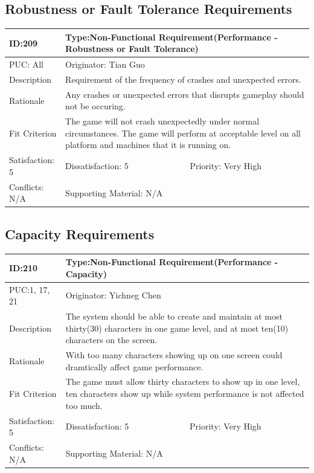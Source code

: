 \documentclass{article}
\begin{document}
	\subsection{Robustness or Fault Tolerance Requirements}
	\begin{table}[H]
		\begin{tabular}{|l|l|l|}
			\hline
			ID:209 & \multicolumn{2}{l|}{Type:Non-Functional Requirement(Performance - Robustness or Fault Tolerance)} \\ \hline
			PUC: All & \multicolumn{2}{l|}{Originator: Tian Guo} \\ \hline
			Description & \multicolumn{2}{m{0.85\textwidth}|}{Requirement of the frequency of crashes and unexpected errors.} \\ \hline
			Rationale & \multicolumn{2}{m{0.85\textwidth}|}{Any crashes or unexpected errors that disrupts gameplay should not be occuring.} \\ \hline
			Fit Criterion & \multicolumn{2}{m{0.85\textwidth}|}{The game will not crash unexpectedly under normal circumstances. The game will perform at acceptable level on all platform and machines that it is running on.} \\ \hline
			Satisfaction: 5 & Dissatisfaction: 5 & Priority: Very High \\ \hline
			Conflicts: N/A & \multicolumn{2}{l|}{Supporting Material: N/A} \\ \hline
		\end{tabular}
	\end{table}

	\subsection{Capacity Requirements}
	\begin{table}[H]
		\begin{tabular}{|l|l|l|}
			\hline
			ID:210 & \multicolumn{2}{l|}{Type:Non-Functional Requirement(Performance - Capacity)} \\ \hline
			PUC:1, 17, 21 & \multicolumn{2}{l|}{Originator: Yichneg Chen} \\ \hline
			Description & \multicolumn{2}{m{0.85\textwidth}|}{The system should be able to create and maintain at most thirty(30) characters in one game level, and at most ten(10) characters on the screen.} \\ \hline
			Rationale & \multicolumn{2}{m{0.85\textwidth}|}{With too many characters showing up on one screen could dramtically affect game performance.} \\ \hline
			Fit Criterion & \multicolumn{2}{m{0.85\textwidth}|}{The game must allow thirty characters to show up in one level, ten characters show up while system performance is not affected too much.} \\ \hline
			Satisfaction: 5 & Dissatisfaction: 5 & Priority: Very High \\ \hline
			Conflicts: N/A & \multicolumn{2}{l|}{Supporting Material: N/A} \\ \hline
		\end{tabular}
	\end{table}
\end{document}
